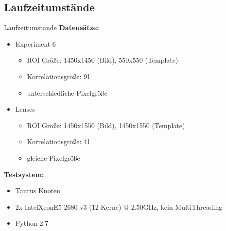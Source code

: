 \subsection{Laufzeitumstände}
\begin{frame}{Laufzeitumstände}
	\textbf{Datensätze:}
	\begin{itemize}
		\item<2-> Experiment 6
		\begin{itemize}
			\item ROI Größe: 1450x1450 (Bild), 550x550 (Template)
			\item Korrelationsgröße: 91
			\item unterschiedliche Pixelgröße
		\end{itemize}
		\item<3-> Lenses
		\begin{itemize}
			\item ROI Größe: 1450x1550 (Bild), 1450x1550 (Template)
			\item Korrelationsgröße: 41
			\item gleiche Pixelgröße
		\end{itemize}
	\end{itemize}
	
	\vspace{0.5cm}
	
	\textbf{Testsystem:}
	\begin{itemize}
		\item<4-> Taurus Knoten
		\item<4-> 2x Intel\textregistered Xeon\textregistered E5-2680 v3 (12 Kerne) @ 2.50GHz, kein MultiThreading
		\item<4-> Python 2.7
	\end{itemize}
\end{frame}

